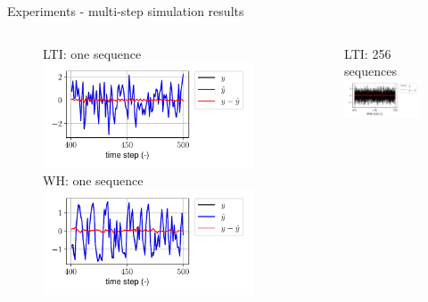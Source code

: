 \documentclass{beamer}
\begin{document}
\begin{frame}{Experiments - multi-step simulation results}
\begin{columns}[t]
\begin{center}
\begin{figure}
LTI: one sequence
\includegraphics[width=\textwidth]{fig/lin_sim_single.pdf}
WH: one sequence
\includegraphics[width=\textwidth]{fig/wh_sim_single.pdf}
\end{figure}
\end{center}
\begin{center}
\begin{figure}
LTI: 256 sequences
\includegraphics[width=\textwidth]{fig/lin_sim_batch.pdf}

\end{figure}
\end{center}
\end{columns}
\end{frame}
\end{document}
